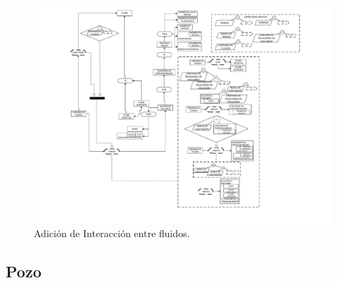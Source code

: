\begin{figure}[h]
	\centering%
	\includegraphics[width=0.9\linewidth]{Kap4/Equilibrium.pdf}%
	\caption{Adición de Interacción entre fluidos.} \label{fig:Contact}
\end{figure}
\subsection{Pozo}\label{sec:PS_Well}



